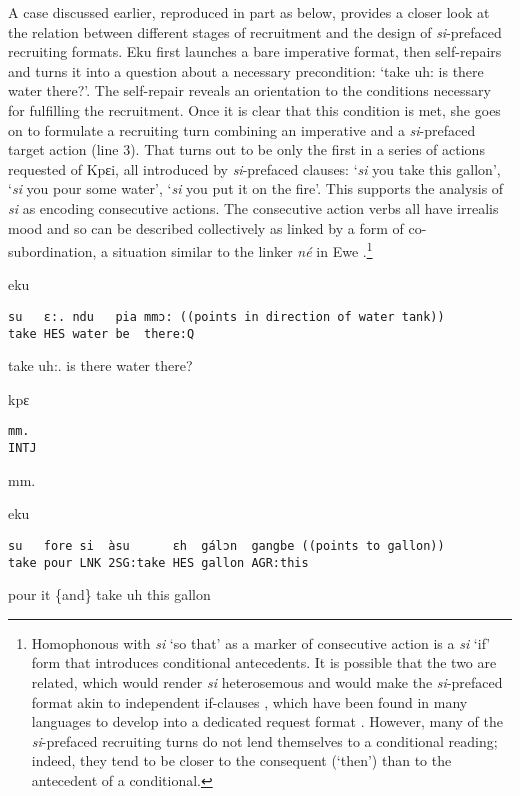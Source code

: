 \documentclass[output=paper]{langsci/langscibook}
\begin{document}
A case discussed earlier, reproduced in part as  below, provides a closer look at the relation between different stages of recruitment and the design of \textit{si}-prefaced recruiting formats. Eku first launches a bare imperative format, then self-repairs and turns it into a question about a necessary precondition: ‘take uh: is there water there?’. The self-repair reveals an orientation to the conditions necessary for fulfilling the recruitment. Once it is clear that this condition is met, she goes on to formulate a recruiting turn combining an imperative and a \textit{si}-prefaced target action (line 3). That turns out to be only the first in a series of actions requested of Kpɛi, all introduced by \textit{si}-prefaced clauses: 
‘\textit{si} you take this gallon’, ‘\textit{si} you pour some water’, ‘\textit{si} you put it on the fire’. This supports the analysis of \textit{si} as encoding consecutive actions. The consecutive action verbs all have irrealis mood and so can be described collectively as linked by a form of co-subordination, a situation similar to the linker \textit{né} in Ewe \citep{ameka_aspect_2008}.\footnote{Homophonous with \textit{si} ‘so that’ as a marker of consecutive action is a \textit{si} ‘if’ form that introduces conditional antecedents. It is possible that the two are related, which would render \textit{si} heterosemous and would make the \textit{si}-prefaced format akin to independent if-clauses \citep{ford_conditionals_1986}, which have been found in many languages to develop into a dedicated request format \citep{evans_insubordination_2007,lindstrom_interactional_2016}. However, many of the \textit{si}-prefaced recruiting turns do not lend themselves to a conditional reading; indeed, they tend to be closer to the consequent (‘then’) than to the antecedent of a conditional.}

\vspace{-1mm}
%
\begin{mdframednoverticalspace}[style=firstfoc]
\begin{transbox}{1}{eku}
\begin{verbatim}
su   ɛ:. ndu   pia mmɔ: ((points in direction of water tank))
take HES water be  there:Q
\end{verbatim}
take uh:. is there water there?
\end{transbox}
\end{mdframednoverticalspace}
%
\begin{transbox}{2}{kpɛ}
\begin{verbatim}
mm.
INTJ
\end{verbatim}
mm.
\end{transbox}
%
\begin{transbox}{3}{eku}
\begin{verbatim}
su   fore si  àsu      ɛh  gálɔn  gangbe ((points to gallon))
take pour LNK 2SG:take HES gallon AGR:this
\end{verbatim}
pour it \{and\} take uh this gallon
\end{transbox}\bigskip
\end{document}
